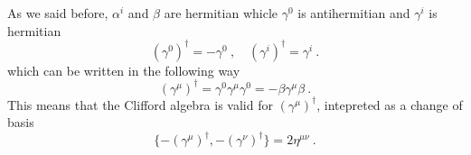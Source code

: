     As we said before, $\alpha^i$ and $\beta$ are hermitian whicle $\gamma^0$ is antihermitian and $\gamma^i$ is hermitian 
    \begin{equation*}
        (\gamma^0)^\dagger = - \gamma^0 ~, \quad (\gamma^i)^\dagger = \gamma^i ~.
    \end{equation*}
    which can be written in the following way 
    \begin{equation}\label{betagamma}
        (\gamma^\mu)^\dagger = \gamma^0 \gamma^\mu \gamma^0 = - \beta \gamma^\mu \beta ~.
    \end{equation}
    This means that the Clifford algebra is valid for $(\gamma^\mu)^\dagger$, intepreted as a change of basis 
    \begin{equation*}
        \{- (\gamma^\mu)^\dagger, - (\gamma^\nu)^\dagger \} = 2 \eta^{\mu\nu} ~.
    \end{equation*}

